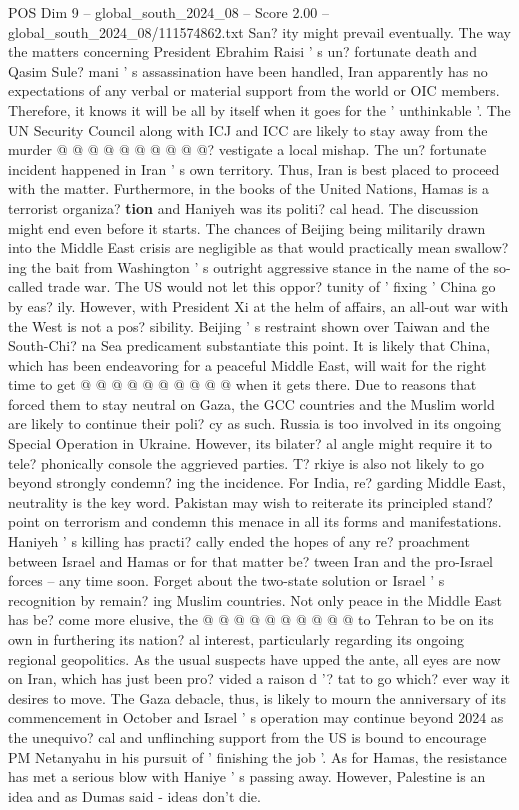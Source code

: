 \begin{textsample}{POS Dim 9 – global\_south\_2024\_08 – Score 2.00 – global\_south\_2024\_08/111574862.txt}
San? ity might prevail eventually.
The way the matters concerning President Ebrahim Raisi ' s un? fortunate death and Qasim Sule? mani ' s assassination have been handled, Iran apparently has no expectations of any verbal or material support from the world or OIC members.
Therefore, it knows it will be all by itself when it goes for the ' unthinkable '.
The UN Security Council along with ICJ and ICC are likely to stay away from the murder @ @ @ @ @ @ @ @ @ @? vestigate a local mishap.
The un? fortunate incident happened in Iran ' s own territory.
Thus, Iran is best placed to proceed with the matter.
Furthermore, in the books of the United Nations, Hamas is a terrorist organiza? \textbf{tion} and Haniyeh was its politi? cal head.
The discussion might end even before it starts.
The chances of Beijing being militarily drawn into the Middle East crisis are negligible as that would practically mean swallow? ing the bait from Washington ' s outright aggressive stance in the name of the so-called trade war.
The US would not let this oppor? tunity of ' fixing ' China go by eas? ily.
However, with President Xi at the helm of affairs, an all-out war with the West is not a pos? sibility.
Beijing ' s restraint shown over Taiwan and the South-Chi? na Sea predicament substantiate this point.
It is likely that China, which has been endeavoring for a peaceful Middle East, will wait for the right time to get @ @ @ @ @ @ @ @ @ @ when it gets there.
Due to reasons that forced them to stay neutral on Gaza, the GCC countries and the Muslim world are likely to continue their poli? cy as such.
Russia is too involved in its ongoing Special Operation in Ukraine.
However, its bilater? al angle might require it to tele? phonically console the aggrieved parties.
T? rkiye is also not likely to go beyond strongly condemn? ing the incidence.
For India, re? garding Middle East, neutrality is the key word.
Pakistan may wish to reiterate its principled stand? point on terrorism and condemn this menace in all its forms and manifestations.
Haniyeh ' s killing has practi? cally ended the hopes of any re? proachment between Israel and Hamas or for that matter be? tween Iran and the pro-Israel forces -- any time soon.
Forget about the two-state solution or Israel ' s recognition by remain? ing Muslim countries.
Not only peace in the Middle East has be? come more elusive, the @ @ @ @ @ @ @ @ @ @ to Tehran to be on its own in furthering its nation? al interest, particularly regarding its ongoing regional geopolitics.
As the usual suspects have upped the ante, all eyes are now on Iran, which has just been pro? vided a raison d '? tat to go which? ever way it desires to move.
The Gaza debacle, thus, is likely to mourn the anniversary of its commencement in October and Israel ' s operation may continue beyond 2024 as the unequivo? cal and unflinching support from the US is bound to encourage PM Netanyahu in his pursuit of ' finishing the job '.
As for Hamas, the resistance has met a serious blow with Haniye ' s passing away.
However, Palestine is an idea and as Dumas said - ideas don't die.

\end{textsample}
